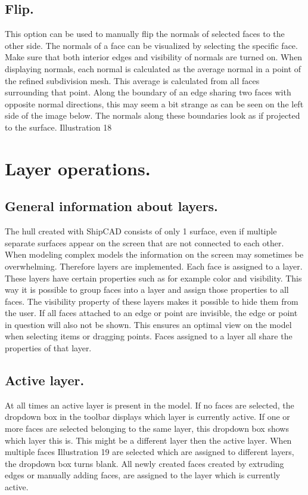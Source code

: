 \documentclass[12pt]{article}
\begin{document}
\subsection{Flip.} \label{flip}
This option can be used to manually flip the normals of selected faces to the other side. The
normals of a face can be visualized by selecting the specific face. Make sure that both interior
edges and visibility of normals are turned on. When displaying normals, each normal is calculated
as the average normal in a point of the refined subdivision mesh. This average is calculated from all
faces surrounding that point. Along the boundary of an edge sharing two faces with opposite normal
directions, this may seem a bit strange as can be seen on the left side of the image below. The
normals along these boundaries look as if projected to the surface.
Illustration 18

\section{Layer operations.}

\subsection{General information about layers.}
The hull created with ShipCAD consists of only 1 surface, even if multiple separate surfaces
appear on the screen that are not connected to each other. When modeling complex models the
information on the screen may sometimes be overwhelming. Therefore layers are implemented.
Each face is assigned to a layer. These layers have certain properties such as for example color
and visibility. This way it is possible to group faces into a layer and assign those properties to all
faces. The visibility property of these layers makes it possible to hide them from the user. If all faces
attached to an edge or point are invisible, the edge or point in question will also not be shown. This
ensures an optimal view on the model when selecting items or dragging points. Faces assigned to a
layer all share the properties of that layer.

\subsection{Active layer.}
At all times an active layer is present in the model. If no
faces are selected, the dropdown box in the toolbar
displays which layer is currently active. If one or more
faces are selected belonging to the same layer, this
dropdown box shows which layer this is. This might be a
different layer then the active layer. When multiple faces
 Illustration 19
are selected which are assigned to different layers, the
dropdown box turns blank. All newly created faces created by extruding edges or manually adding
faces, are assigned to the layer which is currently active.
\end{document}

